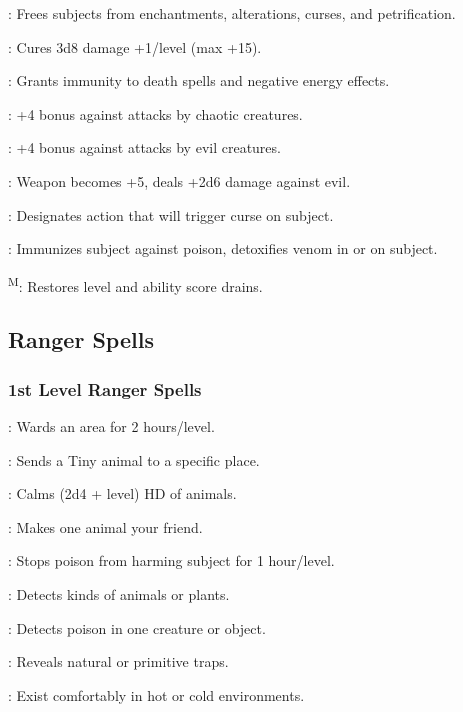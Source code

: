 : Frees subjects from enchantments, alterations, curses, and petrification.

: Cures 3d8 damage +1/level (max +15).

: Grants immunity to death spells and negative energy effects.

: +4 bonus against attacks by chaotic creatures.

: +4 bonus against attacks by evil creatures.

: Weapon becomes +5, deals +2d6 damage against evil.

: Designates action that will trigger curse on subject.

: Immunizes subject against poison, detoxifies venom in or on subject.

\textsuperscript{M}: Restores level and ability score drains.

\subsection{Ranger Spells}

\subsubsection{1st Level Ranger Spells}

: Wards an area for 2 hours/level.

: Sends a Tiny animal to a specific place.

: Calms (2d4 + level) HD of animals.

: Makes one animal your friend.

: Stops poison from harming subject for 1 hour/level.

: Detects kinds of animals or plants.

: Detects poison in one creature or object.

: Reveals natural or primitive traps.

: Exist comfortably in hot or cold environments.

